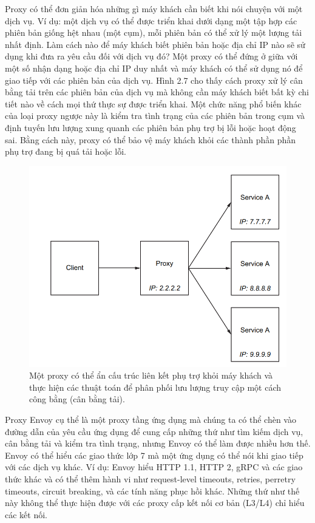 \documentclass[12pt,a4paper]{report}
\begin{document}
		Proxy có thể đơn giản hóa những gì máy khách cần biết khi nói chuyện với một dịch vụ. Ví dụ: một dịch vụ có thể được triển khai dưới dạng một tập hợp các phiên bản giống hệt nhau (một cụm), mỗi phiên bản có thể xử lý một lượng tải nhất định. Làm cách nào để máy khách biết phiên bản hoặc địa chỉ IP nào sẽ sử dụng khi đưa ra yêu cầu đối với dịch vụ đó? Một proxy có thể đứng ở giữa với một số nhận dạng hoặc địa chỉ IP duy nhất và máy khách có thể sử dụng nó để giao tiếp với các phiên bản của dịch vụ. Hình 2.7 cho thấy cách proxy xử lý cân bằng tải trên các phiên bản của dịch vụ mà không cần máy khách biết bất kỳ chi tiết nào về cách mọi thứ thực sự được triển khai. Một chức năng phổ biến khác của loại proxy ngược này là kiểm tra tình trạng của các phiên bản trong cụm và định tuyến lưu lượng xung quanh các phiên bản phụ trợ bị lỗi hoặc hoạt động sai. Bằng cách này, proxy có thể bảo vệ máy khách khỏi các thành phần phần phụ trợ đang bị quá tải hoặc lỗi.
		
		\begin{figure}[h]
			\centering
			\includegraphics[width=0.7\linewidth]{Pics/2.1.3-p2}
			\caption{Một proxy có thể ẩn cấu trúc liên kết phụ trợ khỏi máy khách và thực hiện các thuật toán để phân phối lưu lượng truy cập một cách công bằng (cân bằng tải).}
			\label{fig:2.1.3-2}
		\end{figure}
		
		Proxy Envoy cụ thể là một proxy tầng ứng dụng mà chúng ta có thể chèn vào đường dẫn của yêu cầu ứng dụng để cung cấp những thứ như tìm kiếm dịch vụ, cân bằng tải và kiểm tra tình trạng, nhưng Envoy có thể làm được nhiều hơn thế. Envoy có thể hiểu các giao thức lớp 7 mà một ứng dụng có thể nói khi giao tiếp với các dịch vụ khác. Ví dụ: Envoy hiểu HTTP 1.1, HTTP 2, gRPC và các giao thức khác và có thể thêm hành vi như request-level timeouts, retries, perretry timeouts, circuit breaking, và các tính năng phục hồi khác. Những thứ như thế này không thể thực hiện được với các proxy cấp kết nối cơ bản (L3/L4) chỉ hiểu các kết nối.
		
\end{document}
